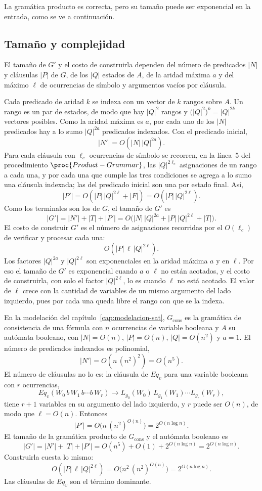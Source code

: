 La gramática producto es correcta, pero su tamaño puede ser exponencial
en la entrada, como se ve a continuación.

\subsection{Tamaño y complejidad}

El tamaño de $G'$ y el costo de construirla dependen del número de
predicados $|N|$ y cláusulas $|P|$ de $G$, de los $|Q|$ estados de $A$,
de la aridad máxima $a$ y del máximo $\ell$ de ocurrencias de símbolo y
argumentos vacíos por cláusula.

Cada predicado de aridad $k$ se indexa con un vector de $k$ rangos sobre
$A$. Un rango es un par de estados, de modo que hay $|Q|^2$ rangos y
$\bigl(|Q|^2\bigr)^k = |Q|^{2k}$ vectores posibles. Como la aridad máxima
es $a$, por cada uno de los $|N|$ predicados hay a lo sumo $|Q|^{2a}$
predicados indexados. Con el predicado inicial,
\[
  |N'| = O(|N|\,|Q|^{2a}).
\]
Para cada cláusula con $\ell_c$ ocurrencias de símbolo se recorren, en la
línea~5 del procedimiento $\proc{Product-Grammar}$, las $|Q|^{2\ell_c}$
asignaciones de un rango a cada una, y por cada una que
cumple las tres condiciones se agrega a lo sumo una cláusula indexada;
las del predicado inicial son una por estado final. Así,
\[
  |P'| = O(|P|\,|Q|^{2\ell} + |F|) = O(|P|\,|Q|^{2\ell}).
\]
Como los terminales son los de $G$, el tamaño de $G'$ es
\[
  |G'| = |N'| + |T| + |P'| = O\bigl(|N|\,|Q|^{2a} + |P|\,|Q|^{2\ell} + |T|\bigr).
\]
El costo de construir $G'$ es el número de asignaciones recorridas por el
$O(\ell_c)$ de verificar y procesar cada una:
\[
  O(|P|\,\ell\,|Q|^{2\ell}).
\]
Los factores $|Q|^{2a}$ y $|Q|^{2\ell}$ son exponenciales en la aridad
máxima $a$ y en $\ell$. Por eso el tamaño de $G'$ es exponencial cuando
$a$ o $\ell$ no están acotados, y el costo de construirla, con solo el
factor $|Q|^{2\ell}$, lo es cuando $\ell$ no está acotado. El valor de
$\ell$ crece con la cantidad de variables de un mismo argumento del lado
izquierdo, pues por cada una queda libre el rango con que se la indexa.

En la modelación del capítulo~\ref{cap:modelacion-sat}, $G_{\mathrm{cons}}$
es la gramática de consistencia de una fórmula con $n$ ocurrencias de
variable booleana y $A$ su autómata booleano, con $|N| = O(n)$,
$|P| = O(n)$,
$|Q| = O(n^2)$ y $a = 1$. El número de predicados indexados es
polinomial,
\[
  |N'| = O(n\,(n^2)^2) = O(n^5).
\]
El número de cláusulas no lo es: la cláusula de $Eq_v$ para una variable
booleana con $r$ ocurrencias,
\[
  Eq_v(W_0\,b\,W_1\,b \cdots b\,W_r) \to L_{g_0}(W_0)\,L_{g_1}(W_1) \cdots L_{g_r}(W_r),
\]
tiene $r+1$ variables en su argumento del lado izquierdo, y $r$ puede ser
$O(n)$, de modo que $\ell = O(n)$. Entonces
\[
  |P'| = O\bigl(n\,(n^2)^{O(n)}\bigr) = 2^{O(n \log n)}.
\]
El tamaño de la gramática producto de $G_{\mathrm{cons}}$ y el autómata
booleano es
\[
  |G'| = |N'| + |T| + |P'| = O(n^5) + O(1) + 2^{O(n\log n)} = 2^{O(n\log n)}.
\]
Construirla cuesta lo mismo:
\[
  O(|P|\,\ell\,|Q|^{2\ell}) = O\bigl(n^2\,(n^2)^{O(n)}\bigr) = 2^{O(n\log n)}.
\]
Las cláusulas de $Eq_v$ son el término dominante.

